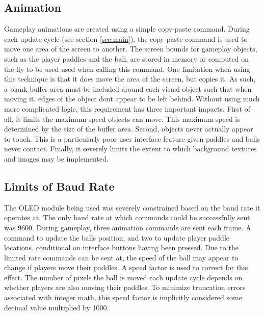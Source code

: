 \subsection{Animation}
\label{sec:animation}

Gameplay animations are created using a simple copy-paste command.
During each update cycle (see section \ref{sec:main}), 
the copy-paste command is used to move one area of the screen to another.
The screen bounds for gameplay objects, such as the player paddles and the ball, are stored in memory or computed on the fly to be used used when calling this command.
One limitation when using this technique is that it does move the area of the screen, but copies it. 
As such, a blank buffer area must be included around each visual object such that when moving it, edges of the object dont appear to be left behind. 
Without using much more complicated logic, this requirement has three important impacts.
First of all, it limits the maximum speed objects can move.
This maximum speed is determined by the size of the buffer area.
Second, objects never actually appear to touch. 
This is a particularly poor user interface feature given paddles and balls never contact.
Finally, it severely limits the extent to which background textures and images may be implemented.

\subsection{Limits of Baud Rate}
\label{sec:baud}

The OLED module being used was severely constrained based on the baud rate it operates at.
The only baud rate at which commands could be successfully sent was 9600.
During gameplay, three animation commands are sent each frame. 
A command to update the balls position, and two to update player paddle locations, conditional on interface buttons having been pressed.
Due to the limited rate commands can be sent at, the speed of the ball may appear to change if players move their paddles.
A speed factor is used to correct for this effect.
The number of pixels the ball is moved each update cycle depends on whether players are also moving their paddles.
To minimize truncation errors associated with integer math, this speed factor is implicitly considered some decimal value multiplied by 1000.
